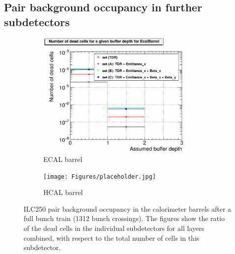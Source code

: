  \clearpage
 \subsection{Pair background occupancy in further \sid subdetectors}

\begin{figure}[!htbp]
 \centering
  \begin{subfigure}[b]{0.49\textwidth}
   \centering
    \includegraphics[width=\textwidth]{Figures/Pairs/Appendix/Occupancy_Comparison_All_layers_deadcells_ILC250_ALL_SETS_ECALBarrel.pdf}
   \caption{\sid ECAL barrel}
   \end{subfigure}
   \hfill
     \begin{subfigure}[b]{0.49\textwidth}
   \centering
    \texttt{[image: Figures/placeholder.jpg]}
   \caption{\sid HCAL barrel}
   \end{subfigure}
   \caption[Pair background occupancy in the \sid calorimater barrels for the ILC250]{ILC250 pair background occupancy in the \sid calorimeter barrels after a full bunch train (1312 bunch crossings).
   The figures show the ratio of the dead cells in the individual subdetectors for all layers combined, with respect to the total number of cells in this subdetector.
   }
   \label{fig:PairBkg:ILC250_Occupancy_Further_detectors}
\end{figure}

